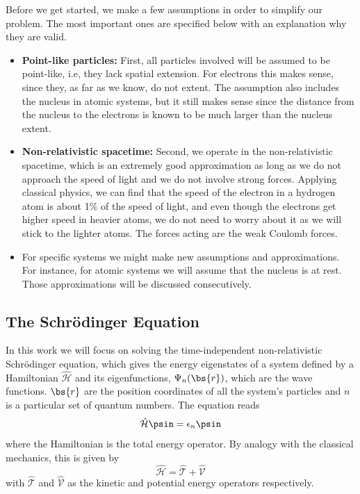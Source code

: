 Before we get started, we make a few assumptions in order to simplify our problem. The most important ones are specified below with an explanation why they are valid.

\begin{itemize}
	\item \textbf{Point-like particles:} First, all particles involved will be assumed to be point-like, i.e, they lack spatial extension. For electrons this makes sense, since they, as far as we know, do not extent. The assumption also includes the nucleus in atomic systems, but it still makes sense since the distance from the nucleus to the electrons is known to be much larger than the nucleus extent.
	
	\item \textbf{Non-relativistic spacetime:}  Second, we operate in the non-relativistic spacetime, which is an extremely good approximation as long as we do not approach the speed of light and we do not involve strong forces. Applying classical physics, we can find that the speed of the electron in a hydrogen atom is about 1\% of the speed of light, and even though the electrons get higher speed in heavier atoms, we do not need to worry about it as we will stick to the lighter atoms. The forces acting are the weak Coulomb forces.
	
	\item For specific systems we might make new assumptions and approximations. For instance, for atomic systems we will assume that the nucleus is at rest. Those approximations will be discussed consecutively. 
\end{itemize}

\subsection{The Schrödinger Equation} \label{subsec:schrodinger}
In this work we will focus on solving the time-independent non-relativistic Schrödinger equation, which gives the energy eigenstates of a system defined by a Hamiltonian $\hat{\mathcal{H}}$ and its eigenfunctions, $\Psi_n(\bs{r})$, which are the wave functions. $\bs{r}$ are the position coordinates of all the system's particles and $n$ is a particular set of quantum numbers. The equation reads
\begin{equation}
\label{eq:Energy}
 \hat{\mathcal{H}}\psin=\epsilon_n\psin
\end{equation}
where the Hamiltonian is the total energy operator. By analogy with the classical mechanics, this is given by
\begin{equation}
\hat{\mathcal{H}}=\hat{\mathcal{T}}+\hat{\mathcal{V}}
\end{equation}
with $\hat{\mathcal{T}}$ and $\hat{\mathcal{V}}$ as the kinetic and potential energy operators respectively. 

